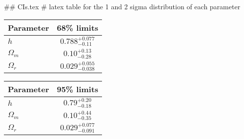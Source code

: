 ## CIs.tex
# latex table for the 1 and 2 sigma distribution of each parameter

\begin{tabular} { l  c}
 Parameter &  68\% limits\\
\hline
{\boldmath$h              $} & $0.788^{+0.077}_{-0.11}    $\\
{\boldmath$\Omega_m       $} & $0.10^{+0.13}_{-0.28}      $\\
{\boldmath$\Omega_r       $} & $0.029^{+0.055}_{-0.038}   $\\
\hline
\end{tabular}

\begin{tabular} { l  c}
 Parameter &  95\% limits\\
\hline
{\boldmath$h              $} & $0.79^{+0.20}_{-0.18}      $\\
{\boldmath$\Omega_m       $} & $0.10^{+0.44}_{-0.35}      $\\
{\boldmath$\Omega_r       $} & $0.029^{+0.077}_{-0.091}   $\\
\hline
\end{tabular}
